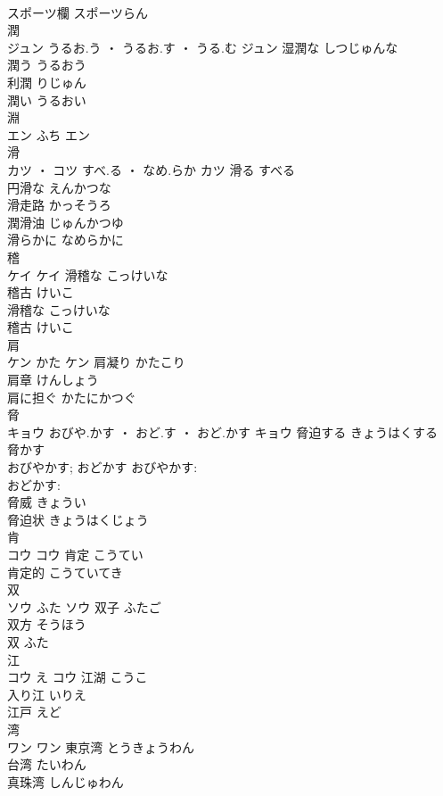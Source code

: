 \documentclass[8pt]{extreport}
\begin{document}
\begin{CJK}{UTF8}{min}
\\	スポーツ欄	スポーツらん	
\\	潤	
\\	ジュン	うるお.う ・ うるお.す ・ うる.む	ジュン	湿潤な	しつじゅんな	
\\	潤う	うるおう	
\\	利潤	りじゅん	
\\	潤い	うるおい	
\\	淵	
\\	エン	ふち	エン																																			
\\	滑	
\\	カツ ・ コツ	すべ.る ・ なめ.らか	カツ	滑る	すべる	
\\	円滑な	えんかつな	
\\	滑走路	かっそうろ	
\\	潤滑油	じゅんかつゆ	
\\	滑らかに	なめらかに	
\\	稽	
\\	ケイ		ケイ	滑稽な	こっけいな	
\\	稽古	けいこ	
\\	滑稽な	こっけいな	
\\	稽古	けいこ	
\\	肩	
\\	ケン	かた	ケン	肩凝り	かたこり	
\\	肩章	けんしょう	
\\	肩に担ぐ	かたにかつぐ	
\\	脅	
\\	キョウ	おびや.かす ・ おど.す ・ おど.かす	キョウ	脅迫する	きょうはくする	
\\	脅かす 
\\	おびやかす; おどかす	おびやかす: 
\\	おどかす: 
\\	脅威	きょうい	
\\	脅迫状	きょうはくじょう	
\\	肯	
\\	コウ		コウ	肯定	こうてい	
\\	肯定的	こうていてき	
\\	双	
\\	ソウ	ふた	ソウ	双子	ふたご	
\\	双方	そうほう	
\\	双	ふた	
\\	江	
\\	コウ	え	コウ	江湖	こうこ	
\\	入り江	いりえ	
\\	江戸	えど	
\\	湾	
\\	ワン		ワン	東京湾	とうきょうわん	
\\	台湾	たいわん	
\\	真珠湾	しんじゅわん	
\end{CJK}
\end{document}
